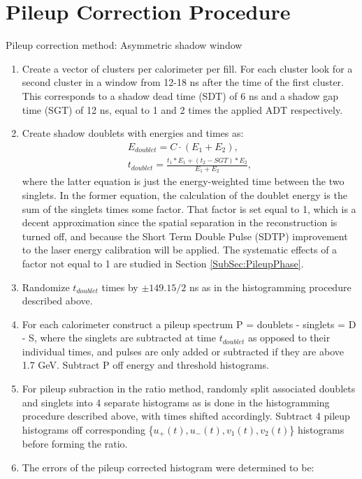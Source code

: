 \section{Pileup Correction Procedure}
\label{Sec:PileupCorrection}

Pileup correction method: Asymmetric shadow window

\begin{enumerate}
	\item{Create a vector of clusters per calorimeter per fill. For each cluster look for a second cluster in a window from 12-18 ns after the time of the first cluster. This corresponds to a shadow dead time (SDT) of 6 ns and a shadow gap time (SGT) of 12 ns, equal to 1 and 2 times the applied ADT respectively.}
	\item{Create shadow doublets with energies and times as:
		\begin{gather}
			E_{doublet} = C \cdot (E_{1} + E_{2}), \\
			t_{doublet} = \frac{t_{1}*E_{1} + (t_{2}-SGT)*E_{2}}{E_{1} + E_{2}},
		\end{gather}
	where the latter equation is just the energy-weighted time between the two singlets. In the former equation, the calculation of the doublet energy is the sum of the singlets times some factor. That factor is set equal to 1, which is a decent approximation since the spatial separation in the reconstruction is turned off, and because the Short Term Double Pulse (SDTP) improvement to the laser energy calibration will be applied. The systematic effects of a factor not equal to 1 are studied in Section \ref{SubSec:PileupPhase}.}
	\item{Randomize $t_{doublet}$ times by $\pm 149.15/2$ ns as in the histogramming procedure described above.}
	\item{For each calorimeter construct a pileup spectrum P = doublets - singlets = D - S, where the singlets are subtracted at time $t_{doublet}$ as opposed to their individual times, and pulses are only added or subtracted if they are above 1.7 GeV. Subtract P off energy and threshold histograms.}
	\item{For pileup subraction in the ratio method, randomly split associated doublets and singlets into 4 separate histograms as is done in the histogramming procedure described above, with times shifted accordingly. Subtract 4 pileup histograms off corresponding \{$u_{+}(t), u_{-}(t), v_{1}(t), v_{2}(t)$\} histograms before forming the ratio.}
	\item{The errors of the pileup corrected histogram were determined to be: 
}
\end{enumerate}
